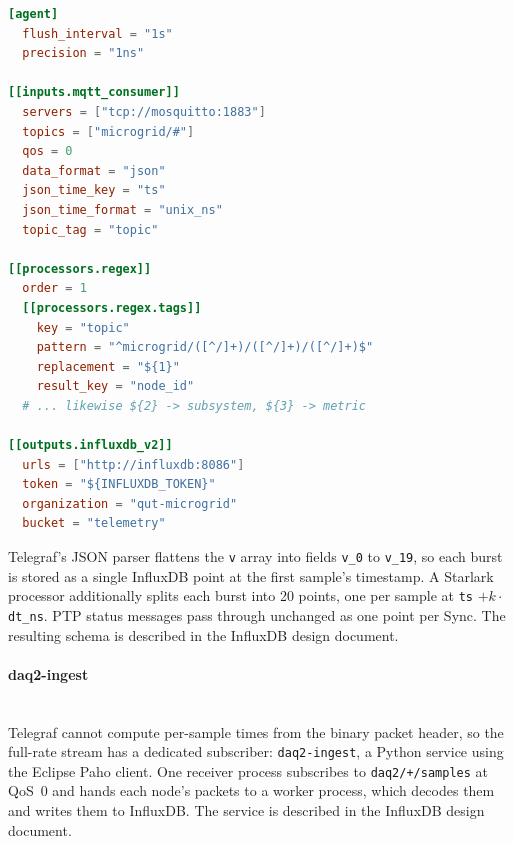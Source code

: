 \begin{lstlisting}[language=toml]
[agent]
  flush_interval = "1s"
  precision = "1ns"

[[inputs.mqtt_consumer]]
  servers = ["tcp://mosquitto:1883"]
  topics = ["microgrid/#"]
  qos = 0
  data_format = "json"
  json_time_key = "ts"
  json_time_format = "unix_ns"
  topic_tag = "topic"

[[processors.regex]]
  order = 1
  [[processors.regex.tags]]
    key = "topic"
    pattern = "^microgrid/([^/]+)/([^/]+)/([^/]+)$"
    replacement = "${1}"
    result_key = "node_id"
  # ... likewise ${2} -> subsystem, ${3} -> metric

[[outputs.influxdb_v2]]
  urls = ["http://influxdb:8086"]
  token = "${INFLUXDB_TOKEN}"
  organization = "qut-microgrid"
  bucket = "telemetry"
\end{lstlisting}

Telegraf's JSON parser flattens the \texttt{v} array into fields \texttt{v\_0} to \texttt{v\_19}, so each burst is stored as a single InfluxDB point at the first sample's timestamp. A Starlark processor additionally splits each burst into 20 points, one per sample at \texttt{ts} $+ k \cdot$ \texttt{dt\_ns}. PTP status messages pass through unchanged as one point per Sync. The resulting schema is described in the InfluxDB design document.

\paragraph{daq2-ingest} ~\\
Telegraf cannot compute per-sample times from the binary packet header, so the full-rate stream has a dedicated subscriber: \texttt{daq2-ingest}, a Python service using the Eclipse Paho client. One receiver process subscribes to \texttt{daq2/+/samples} at QoS~0 and hands each node's packets to a worker process, which decodes them and writes them to InfluxDB. The service is described in the InfluxDB design document.
